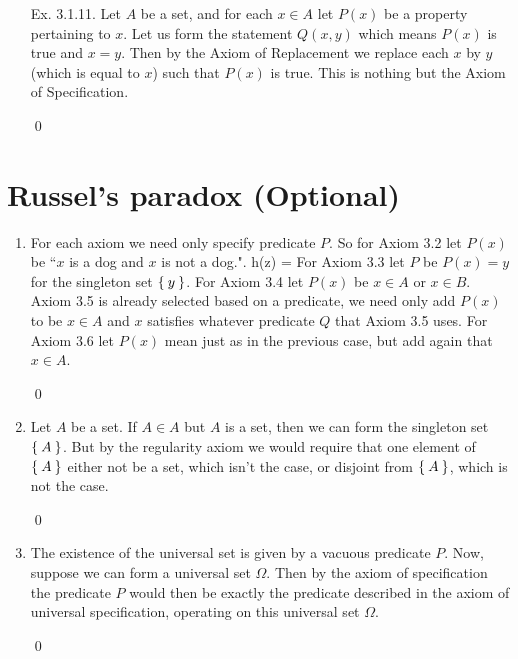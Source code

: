 \begin{enumerate}[Ex. 3.1.1.]
    Now, we have $(A - B) \cup (A\cap B) \cup (B - A) = A\cup B$ since any element of the LHS
    is an element of exactly one of the three sets, and in either case it must belong to either
    $A$, $B$, or both. Similarly any element of $A\cup B$ belong either to $A$, $B$, or both, and
    is thus an element of exactly one of the three sets on the LHS.

    \qed

    \item[Ex. 3.1.11.] Let $A$ be a set, and for each $x\in A$ let $P(x)$ be a property pertaining to $x$.
    Let us form the statement $Q(x,y)$ which means $P(x)$ is true and $x = y$. Then by the
    Axiom of Replacement we replace each $x$ by $y$ (which is equal to $x$) such that $P(x)$
    is true. This is nothing but the Axiom of Specification.

    \qed
\end{enumerate}


\section{Russel's paradox (Optional)}
\begin{enumerate}[Ex. 3.2.1]
    \item For each axiom we need only specify predicate $P$. So for Axiom 3.2
    let $P(x)$ be ``$x$ is a dog and $x$ is not a dog.". h(z) = For Axiom 3.3 let
    $P$ be $P(x) = y$ for the singleton set $\Set{y}$. For Axiom 3.4 let
    $P(x)$ be $x\in A$ or $x \in B$. Axiom 3.5 is already selected based on a
    predicate, we need only add $P(x)$ to be $x\in A$ and $x$ satisfies whatever
    predicate $Q$ that Axiom 3.5 uses. For Axiom 3.6 let $P(x)$ mean just as in
    the previous case, but add again that $x\in A$.

    \qed

    \item Let $A$ be a set. If $A\in A$ but $A$ is a set, then we can form
    the singleton set $\Set{A}$. But by the regularity axiom we would require
    that one element of $\Set{A}$ either not be a set, which isn't the case,
    or disjoint from $\Set{A}$, which is not the case.

    \qed

    \item The existence of the universal set is given by a vacuous predicate $P$.
    Now, suppose we can form a universal set $\Omega$. Then by the axiom of
    specification the predicate $P$ would then be exactly the predicate described
    in the axiom of universal specification, operating on this universal set $\Omega$. 

    \qed
\end{enumerate}


